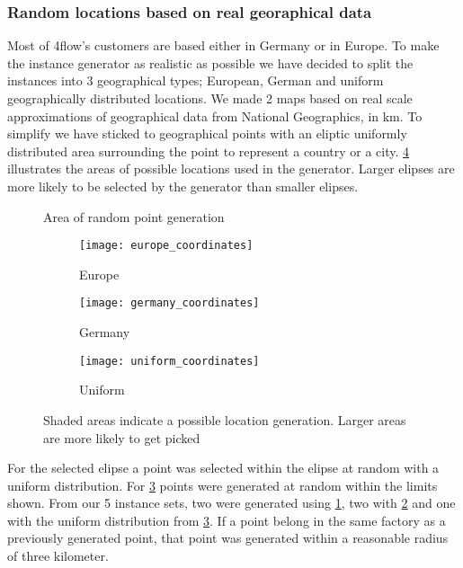 \documentclass[../main.tex]{subfiles}
\begin{document}
\subsubsection{Random locations based on real georaphical data}
Most of 4flow's customers are based either in Germany or in Europe. 
To make the instance generator as realistic as possible we have decided to split the instances into 3 geographical types; 
European, German and uniform geographically distributed locations.
We made 2 maps based on real scale approximations of geographical data from National Geographics, in km.
To simplify we have sticked to geographical points with an eliptic uniformly distributed area surrounding the point to represent a country or a city.
\cref{fig:areas} illustrates the areas of possible locations used in the generator. 
Larger elipses are more likely to be selected by the generator than smaller elipses.
\begin{figure}
\centering
    \caption{Area of random point generation}
    \begin{subfigure}[b]{0.3\textwidth}
        \centering
        \texttt{[image: europe\_coordinates]}
        \caption{Europe}
        \label{fig:eur}
    \end{subfigure}
    \hfill
    \begin{subfigure}[b]{0.3\textwidth}
        \centering
        \texttt{[image: germany\_coordinates]}
        \caption{Germany}
        \label{fig:ger}
    \end{subfigure}
    \hfill
    \begin{subfigure}[b]{0.3\textwidth}
        \centering
        \texttt{[image: uniform\_coordinates]}
        \caption{Uniform}
        \label{fig:uni}
    \end{subfigure}
    \label{fig:areas}
    \caption*{Shaded areas indicate a possible location generation. Larger areas are more likely to get picked}
\end{figure}

For the selected elipse a point was selected within the elipse at random with a uniform distribution.
For \cref{fig:uni} points were generated at random within the limits shown.
From our 5 instance sets, two were generated using \cref{fig:eur}, two with \cref{fig:ger} and one with the uniform distribution from \cref{fig:uni}. 
If a point belong in the same factory as a previously generated point, that point was generated within a reasonable radius of three kilometer.
\end{document}
